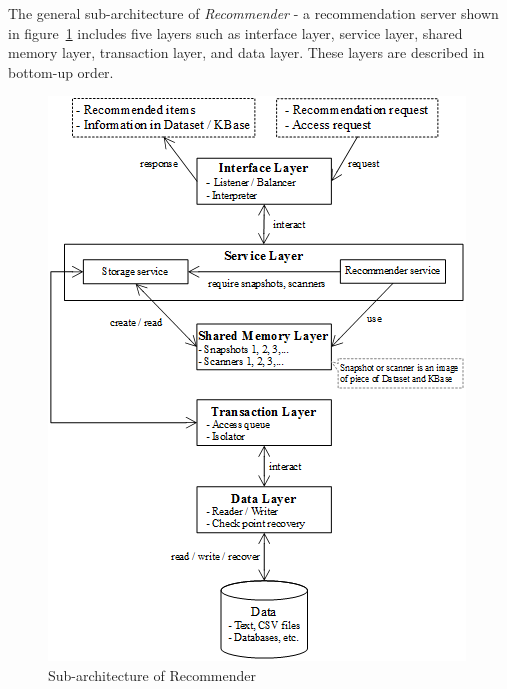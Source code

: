 \documentclass[a4paper,twoside]{article}
\begin{document}
The general sub-architecture of \textit{Recommender} - a recommendation server shown in figure~\ref{figure:recommender-subarchitecture} includes five layers such as interface layer, service layer, shared memory layer, transaction layer, and data layer. These layers are described in bottom-up order.
\begin{figure}
\centering
\includegraphics{ServerGeneralArchitecture.png}
\caption{Sub-architecture of Recommender}
\label{figure:recommender-subarchitecture}
\end{figure}
\end{document}
